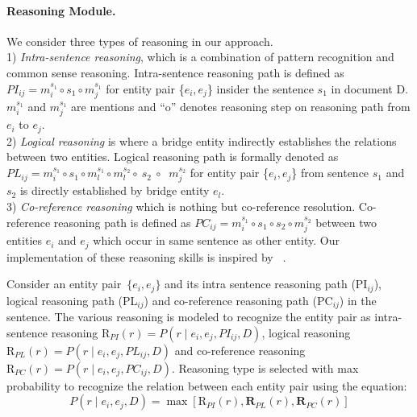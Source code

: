 \documentclass[letterpaper]{article} %
\begin{document}
\paragraph{\textbf{Reasoning Module.}} We consider three types of reasoning in our approach. \\
  1) \textit{Intra-sentence reasoning}, which is a combination of pattern recognition and common sense reasoning. 
  Intra-sentence reasoning path is defined as \( P I_{i j}=m_{i}^{s_{1}} \circ s_{1} \circ m_{j}^{s_{1}} \) for entity pair \{$e_i,e_j$\} insider the sentence $s_1$ in document D. $m_i^{s_1}$ and $m_j^{s_1}$ are mentions and \enquote{o} denotes reasoning step on reasoning path from $e_i$ to $e_j$.  \\
  2) \textit{Logical reasoning} is where a bridge entity indirectly establishes the relations between two entities.
  Logical reasoning path is formally denoted as \( P L_{i j}=m_{i}^{s_{1}} \circ s_{1} \circ m_{l}^{s_{1}} \circ m_{l}^{s_{2}} \circ \ s_{2}\  \circ \)  \(\  m_{j}^{s_{2}} \) for entity pair \{$e_i,e_j$\} from sentence $s_1$ and $s_2$ is directly established by bridge entity $e_l$.   \\
  3) \textit{Co-reference reasoning} which is nothing but co-reference resolution. %
  Co-reference reasoning path is defined as \( PC_{ij}=m_{i}^{s_{1}} \circ s_{1} \circ s_{2} \circ m_{j}^{s_{2}} \) between two entities $e_i$ and $e_j$ which occur in same sentence as other entity. Our implementation of these reasoning skills is inspired by ~\cite{xu-etal-2021-discriminative}.

Consider an entity pair~$\{e_i,e_j\}$ and its intra sentence reasoning path (PI$_{i j}$), logical reasoning path (PL$_{i j}$) and co-reference reasoning path (PC$_{i j}$) in the sentence. The various reasoning is modeled to recognize the entity pair as intra-sentence reasoning \( \mathrm{R}_{P I}(r)=P\left(r \mid e_{i}, e_{j}, P I_{i j}, D\right) \), logical reasoning \( \mathrm{R}_{P L}(r)=P\left(r \mid e_{i}, e_{j}, P L_{i j}, D\right) \)
 and co-reference reasoning \( \mathrm{R}_{P C}(r)=P\left(r \mid e_{i}, e_{j}, P C_{i j}, D\right) \).
 Reasoning type is selected with max probability to recognize the relation between each entity pair using the equation:
 \begin{equation}
     P\left(r \mid e_{i}, e_{j}, D\right)=\max \left[\mathrm{R}_{P I}(r), \mathbf{R}_{P L}(r), \mathbf{R}_{P C}(r)\right] 
 \end{equation}
\end{document}
